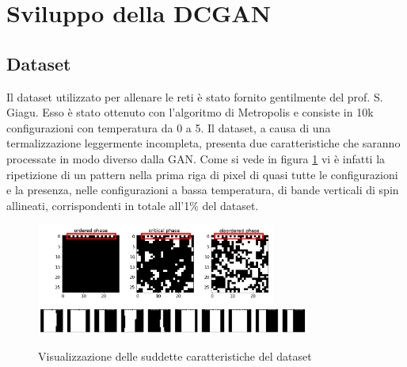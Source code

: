 \documentclass[a4paper]{article}
\begin{document}
\section{Sviluppo della DCGAN}
\subsection{Dataset}
Il dataset utilizzato per allenare le reti è stato fornito gentilmente del prof. S. Giagu. Esso è stato ottenuto con l'algoritmo di Metropolis e consiste in 10k configurazioni con temperatura da 0 a 5. Il dataset, a causa di una termalizzazione leggermente incompleta, presenta due caratteristiche che saranno processate in modo diverso dalla GAN. Come si vede in figura \ref{difetti} vi è infatti la ripetizione di un pattern nella prima riga di pixel di quasi tutte le configurazioni e la presenza, nelle configurazioni a bassa temperatura, di bande verticali di spin allineati, corrispondenti in totale all'1\% del dataset.
\begin{figure}[H]
\includegraphics[width=0.7\textwidth]{dataset.png}\\
\includegraphics[width=0.8\textwidth]{difetti.png}
\centering
\caption{Visualizzazione delle suddette caratteristiche del dataset}
\label{difetti}
\end{figure}
\end{document}

